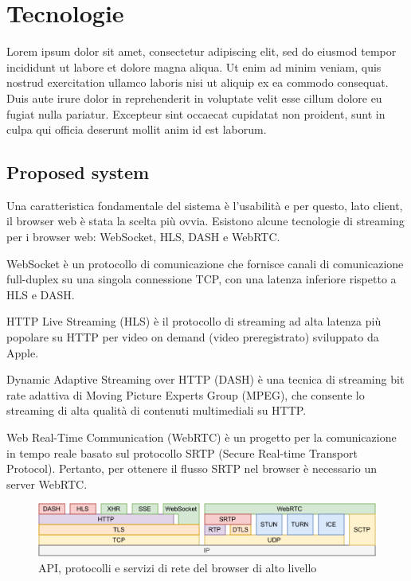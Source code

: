 %
%
\chapter{Tecnologie}

Lorem ipsum dolor sit amet, consectetur adipiscing elit, sed do eiusmod tempor incididunt ut labore et dolore magna aliqua. Ut enim ad minim veniam, quis nostrud exercitation ullamco laboris nisi ut aliquip ex ea commodo consequat. Duis aute irure dolor in reprehenderit in voluptate velit esse cillum dolore eu fugiat nulla pariatur. Excepteur sint occaecat cupidatat non proident, sunt in culpa qui officia deserunt mollit anim id est laborum.


\section{Proposed system}
Una caratteristica fondamentale del sistema è l'usabilità e per questo, lato client, il browser web è stata la scelta più ovvia.
Esistono alcune tecnologie di streaming per i browser web: WebSocket, HLS, DASH e WebRTC\cite{Audio_and_video_delivery}.

WebSocket è un protocollo di comunicazione che fornisce canali di comunicazione full-duplex su una singola connessione TCP, con una latenza inferiore rispetto a HLS e DASH.

HTTP Live Streaming (HLS) è il protocollo di streaming ad alta latenza più popolare su HTTP per video on demand (video preregistrato) sviluppato da Apple.

Dynamic Adaptive Streaming over HTTP (DASH) è una tecnica di streaming bit rate adattiva di Moving Picture Experts Group (MPEG), che consente lo streaming di alta qualità di contenuti multimediali su HTTP.

Web Real-Time Communication (WebRTC) è un progetto per la comunicazione in tempo reale basato sul protocollo SRTP (Secure Real-time Transport Protocol). Pertanto, per ottenere il flusso SRTP nel browser è necessario un server WebRTC\cite{High_Performance_Browser_Networking}.

\begin{figure}[H]
	\includegraphics[width=\linewidth]{immagini/webprotocols}
	\caption{API, protocolli e servizi di rete del browser di alto livello}
	\label{fig:webprotocols}
\end{figure}

